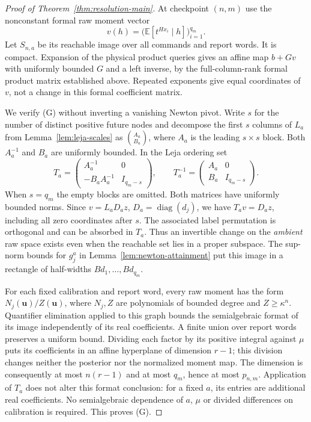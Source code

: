 \documentclass[11pt]{amsart}
\theoremstyle{definition}\newtheorem{definition}[theorem]{Definition}
\theoremstyle{remark}\newtheorem{remark}[theorem]{Remark}
\newcommand{\E}{\mathbb E}\newcommand{\Prob}{\mathbb P}
\begin{document}
\begin{proof}[Proof of Theorem~\ref{thm:resolution-main}]
At checkpoint $(n,m)$ use the nonconstant formal raw moment vector
\[
 v(h)=\bigl(\E[t^{Hx_i}\mid h]\bigr)_{i=1}^{q_m}.
\]
Let $S_{n,a}$ be its reachable image over all commands and report words.
It is compact. Expansion of the physical product queries gives an
affine map $b+Gv$ with uniformly bounded $G$ and a left inverse, by
the full-column-rank formal product matrix established above. Repeated
exponents give equal coordinates of $v$, not a change in this formal
coefficient matrix.

We verify (G) without inverting a vanishing Newton pivot. Write
$s$ for the number of distinct positive future nodes and decompose the
first $s$ columns of $L_a$ from Lemma~\ref{lem:leja-scales} as
$\binom{A_a}{B_a}$, where $A_a$ is the leading $s\times s$ block.
Both $A_a^{-1}$ and $B_a$ are uniformly bounded. In the Leja ordering set
\[
 T_a=\begin{pmatrix}
       A_a^{-1}&0\\-B_aA_a^{-1}&I_{q_m-s}
     \end{pmatrix},\qquad
 T_a^{-1}=\begin{pmatrix}A_a&0\\B_a&I_{q_m-s}\end{pmatrix}.
\]
When $s=q_m$ the empty blocks are omitted. Both matrices have uniformly
bounded norms. Since $v=L_aD_az$, $D_a=\operatorname{diag}(d_j)$,
we have $T_av=D_az$, including all zero coordinates after $s$.
The associated label permutation is orthogonal and can be absorbed in
$T_a$. Thus an invertible change on the \emph{ambient} raw space exists
even when the reachable set lies in a proper subspace. The sup-norm
bounds for $g_j^a$ in Lemma~\ref{lem:newton-attainment} put this image
in a rectangle of half-widths $B d_1,\ldots,B d_{q_m}$.

For each fixed calibration and report word, every raw moment has the
form $N_j(\boldsymbol u)/Z(\boldsymbol u)$, where $N_j,Z$ are
polynomials of bounded degree and $Z\ge\kappa^n$. Quantifier
elimination applied to this graph bounds the semialgebraic format of
its image independently of its real coefficients. A finite union over
report words preserves a uniform bound. Dividing each factor by its
positive integral against $\mu$ puts its coefficients in an affine
hyperplane of dimension $r-1$; this division changes neither the
posterior nor the normalized moment map. The dimension is consequently
at most $n(r-1)$ and at most $q_m$, hence at most $p_{n,m}$.
Application of $T_a$ does not alter this format conclusion: for a fixed
$a$, its entries are additional real coefficients. No semialgebraic
dependence of $a$, $\mu$ or divided differences on calibration is
required. This proves (G).


\end{proof}
\end{document}
